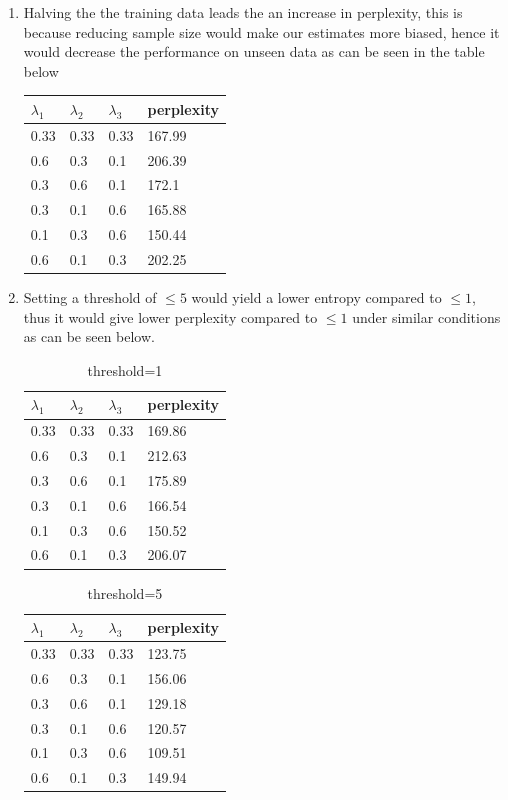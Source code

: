 \documentclass[12pt]{article}
\begin{document}
\begin{center}
\begin{enumerate}[label=(\alph*)]
\begin{enumerate}
		\item Halving the the training data leads the an increase in perplexity, this is because reducing sample size would make our estimates more biased, hence it would decrease the performance on unseen data as can be seen in the table below 
		\begin{table}[!ht]
			\centering
			\begin{tabular}{|l|l|l|l|}
				\hline
				$\lambda_1$ & $\lambda_2$ & $\lambda_3$ & perplexity \\ \hline
				0.33 & 0.33 & 0.33 & 167.99 \\ \hline
				0.6 & 0.3 & 0.1 & 206.39 \\ \hline
				0.3 & 0.6 & 0.1 & 172.1 \\ \hline
				0.3 & 0.1 & 0.6 & 165.88 \\ \hline
				0.1 & 0.3 & 0.6 & 150.44 \\ \hline
				0.6 & 0.1 & 0.3 & 202.25 \\ \hline
			\end{tabular}
		\end{table}
		
	
	\item Setting a threshold of $\le5$ would yield a lower entropy compared to $\le1$, thus it would give lower perplexity compared to $\le1$ under similar conditions as can be seen below.
	
	\begin{table}[H]
		\centering
		\begin{tabular}{|l|l|l|l|}
			\hline
			$\lambda_1$ & $\lambda_2$ & $\lambda_3$ & perplexity \\ \hline
			0.33 & 0.33 & 0.33 & 169.86 \\ \hline
			0.6 & 0.3 & 0.1 & 212.63 \\ \hline
			0.3 & 0.6 & 0.1 & 175.89 \\ \hline
			0.3 & 0.1 & 0.6 & 166.54 \\ \hline
			0.1 & 0.3 & 0.6 & 150.52 \\ \hline
			0.6 & 0.1 & 0.3 & 206.07 \\ \hline
		\end{tabular}
	\caption{threshold=1}
	\end{table}

\begin{table}[!ht]
	\centering
	\begin{tabular}{|l|l|l|l|}
		\hline
		$\lambda_1$ & $\lambda_2$ & $\lambda_3$ & perplexity \\ \hline
		0.33 & 0.33 & 0.33 & 123.75 \\ \hline
		0.6 & 0.3 & 0.1 & 156.06 \\ \hline
		0.3 & 0.6 & 0.1 & 129.18 \\ \hline
		0.3 & 0.1 & 0.6 & 120.57 \\ \hline
		0.1 & 0.3 & 0.6 & 109.51 \\ \hline
		0.6 & 0.1 & 0.3 & 149.94 \\ \hline
	\end{tabular}
\caption{threshold=5}
\end{table}
	

\end{enumerate}
\end{enumerate}
\end{center}
\end{document}
